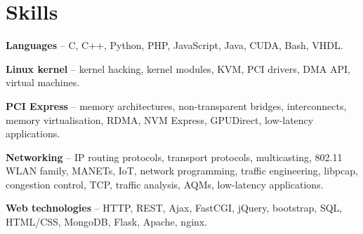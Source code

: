 \section{Skills}
\begin{small}
	\parbox[t][][t]{\linewidth}{
		\textbf{Languages} -- C, C++, Python, PHP, JavaScript, Java, CUDA, Bash, VHDL.
		\smallbreak
	}
	\parbox[t][][t]{\linewidth}{
		\textbf{Linux kernel} -- kernel hacking, kernel modules,
		KVM, PCI drivers, DMA API, virtual machines.
		\smallbreak
	}
	\parbox[t][][t]{\linewidth}{
		\textbf{PCI Express} -- memory architectures, non-transparent bridges, 
		interconnects, memory virtualisation, RDMA, NVM Express, GPUDirect,
		low-latency applications.
		\smallbreak
	}
	\parbox[t][][t]{\linewidth}{
		\textbf{Networking} -- IP routing protocols, transport protocols,
		multicasting, 802.11 WLAN family, MANETs, IoT, network programming, 
		traffic engineering, libpcap, congestion control, TCP, traffic
		analysis, AQMs, low-latency applications.
		\smallbreak
	}
	\parbox[t][][t]{\linewidth}{
		\textbf{Web technologies} -- HTTP, REST, Ajax, FastCGI, jQuery,
		bootstrap, SQL, HTML/CSS, MongoDB, Flask, Apache, nginx.
		\smallbreak
	}
\end{small}

